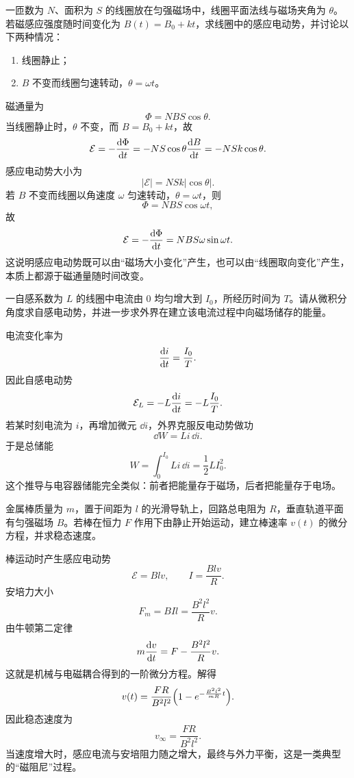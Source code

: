 \begin{classic}
一匝数为 $N$、面积为 $S$ 的线圈放在匀强磁场中，线圈平面法线与磁场夹角为 $\theta$。若磁感应强度随时间变化为 $B(t)=B_0+kt$，求线圈中的感应电动势，并讨论以下两种情况：
\begin{enumerate}
  \item 线圈静止；
  \item $B$ 不变而线圈匀速转动，$\theta=\omega t$。
\end{enumerate}

\begin{solution}
磁通量为
\[
\Phi=NB S\cos\theta.
\]
当线圈静止时，$\theta$ 不变，而 $B=B_0+kt$，故
\[
\mathcal{E}=-\dv{\Phi}{t}=-NS\cos\theta\dv{B}{t}=-NSk\cos\theta.
\]
感应电动势大小为
\[
|\mathcal{E}|=NSk|\cos\theta|.
\]
若 $B$ 不变而线圈以角速度 $\omega$ 匀速转动，$\theta=\omega t$，则
\[
\Phi=NBS\cos \omega t,
\]
故
\[
\mathcal{E}=-\dv{\Phi}{t}=NBS\omega\sin\omega t.
\]
这说明感应电动势既可以由“磁场大小变化”产生，也可以由“线圈取向变化”产生，本质上都源于磁通量随时间改变。
\end{solution}
\end{classic}

\begin{classic}
一自感系数为 $L$ 的线圈中电流由 $0$ 均匀增大到 $I_0$，所经历时间为 $T$。请从微积分角度求自感电动势，并进一步求外界在建立该电流过程中向磁场储存的能量。

\begin{solution}
电流变化率为
\[
\dv{i}{t}=\frac{I_0}{T}.
\]
因此自感电动势
\[
\mathcal{E}_L=-L\dv{i}{t}=-L\frac{I_0}{T}.
\]
若某时刻电流为 $i$，再增加微元 $\dd{i}$，外界克服反电动势做功
\[
\dd{W}=L i\,\dd{i}.
\]
于是总储能
\[
W=\int_0^{I_0} Li\,\dd{i}=\frac12 LI_0^2.
\]
这个推导与电容器储能完全类似：前者把能量存于磁场，后者把能量存于电场。
\end{solution}
\end{classic}

\begin{competition}
金属棒质量为 $m$，置于间距为 $l$ 的光滑导轨上，回路总电阻为 $R$，垂直轨道平面有匀强磁场 $B$。若棒在恒力 $F$ 作用下由静止开始运动，建立棒速率 $v(t)$ 的微分方程，并求稳态速度。

\begin{solution}
棒运动时产生感应电动势
\[
\mathcal{E}=Blv,
\qquad I=\frac{Blv}{R}.
\]
安培力大小
\[
F_m=BIl=\frac{B^2l^2}{R}v.
\]
由牛顿第二定律
\[
m\dv{v}{t}=F-\frac{B^2l^2}{R}v.
\]
这就是机械与电磁耦合得到的一阶微分方程。解得
\[
v(t)=\frac{FR}{B^2l^2}\qty(1-e^{-\frac{B^2l^2}{mR}t}).
\]
因此稳态速度为
\[
v_{\infty}=\frac{FR}{B^2l^2}.
\]
当速度增大时，感应电流与安培阻力随之增大，最终与外力平衡，这是一类典型的“磁阻尼”过程。
\end{solution}
\end{competition}

